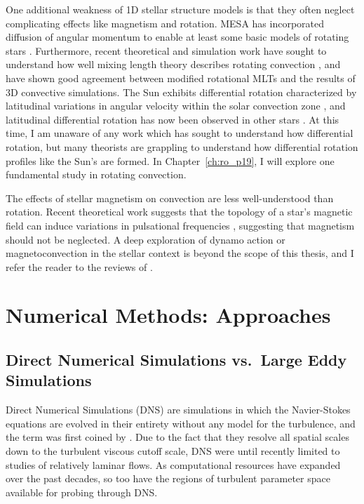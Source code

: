 One additional weakness of 1D stellar structure models is that they often neglect complicating effects like magnetism and rotation.
MESA has incorporated diffusion of angular momentum to enable at least some basic models of rotating stars \citep{paxton&all2013}.
Furthermore, recent theoretical and simulation work have sought to understand how well mixing length theory describes rotating convection \citep{BDLithwick2014, currie&all2020}, and have shown good agreement between modified rotational MLTs and the results of 3D convective simulations.
The Sun exhibits differential rotation characterized by latitudinal variations in angular velocity within the solar convection zone \citep{thompson&all1996, schou&all1998}, and latitudinal differential rotation has now been observed in other stars \citep{benomar&all2018}.
At this time, I am unaware of any work which has sought to understand how differential rotation, but many theorists \citep[e.g.,][]{brun&all2017} are grappling to understand how differential rotation profiles like the Sun's are formed.
In Chapter~\ref{ch:ro_p19}, I will explore one fundamental study in rotating convection.

The effects of stellar magnetism on convection are less well-understood than rotation.
Recent theoretical work suggests that the topology of a star's magnetic field can induce variations in pulsational frequencies \citep{santos&all2018}, suggesting that magnetism should not be neglected.
A deep exploration of dynamo action or magnetoconvection in the stellar context is beyond the scope of this thesis, and I refer the reader to the reviews of \citet{brandenburg&subramian2005, charbonneau2010, charbonneau2014, brun&browning2017}.



\section{Numerical Methods: Approaches}
\label{sct:numerics}

\subsection{Direct Numerical Simulations vs.~Large Eddy Simulations}
Direct Numerical Simulations (DNS) are simulations in which the Navier-Stokes equations are evolved in their entirety without any model for the turbulence, and the term was first coined by \citet{orzag1970}.
Due to the fact that they resolve all spatial scales down to the turbulent viscous cutoff scale, DNS were until recently limited to studies of relatively laminar flows.
As computational resources have expanded over the past decades, so too have the regions of turbulent parameter space available for probing through DNS.


